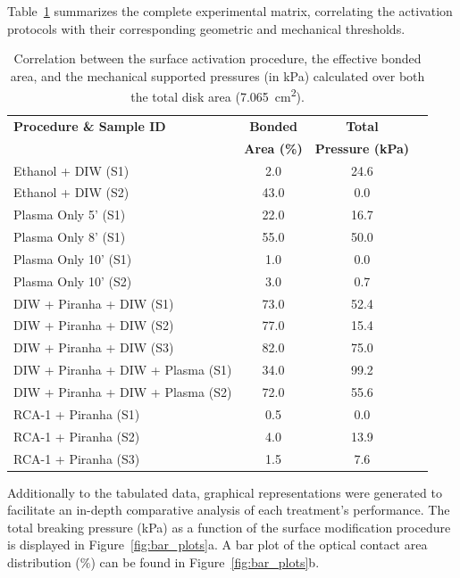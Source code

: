Table~\ref{tab:tensile_results} summarizes the complete experimental matrix,
correlating the activation protocols with their corresponding geometric and
mechanical thresholds.
\begin{table}[htbp]
    \centering
    \caption{Correlation between the surface activation procedure, the
    effective bonded area, and the mechanical supported pressures (in kPa)
    calculated over both the total disk area (\SI{7.065}{\centi\meter\squared}).}
    \label{tab:tensile_results}
    \begin{tabular}{lccc}
        \toprule
        \textbf{Procedure \& Sample ID} & \textbf{Bonded} & \textbf{Total} 
        \\
                                        & \textbf{Area (\%)} &
        \textbf{Pressure (kPa)}  \\
        \midrule
        Ethanol + DIW (S1)                & 2.0  & 24.6   \\
        Ethanol + DIW (S2)                & 43.0 & 0.0      \\
        Plasma Only 5' (S1)               & 22.0 & 16.7    \\
        Plasma Only 8' (S1)               & 55.0 & 50.0  \\
        Plasma Only 10' (S1)              & 1.0  & 0.0      \\
        Plasma Only 10' (S2)              & 3.0  & 0.7     \\
        DIW + Piranha + DIW (S1)          & 73.0 & 52.4     \\
        DIW + Piranha + DIW (S2)          & 77.0 & 15.4     \\
        DIW + Piranha + DIW (S3)          & 82.0 & 75.0    \\
        DIW + Piranha + DIW + Plasma (S1) & 34.0 & 99.2  \\
        DIW + Piranha + DIW + Plasma (S2) & 72.0 & 55.6    \\
        RCA-1 + Piranha (S1)              & 0.5  & 0.0      \\
        RCA-1 + Piranha (S2)              & 4.0  & 13.9    \\
        RCA-1 + Piranha (S3)              & 1.5  & 7.6    \\
        \bottomrule
    \end{tabular}
\end{table}

Additionally to the tabulated data, graphical representations were generated
to facilitate an in-depth comparative analysis of each treatment's
performance. The total breaking pressure (kPa) as a
function of the surface modification procedure is displayed in
Figure~\ref{fig:bar_plots}a. A bar plot of the optical
contact area distribution ($\%$) can be found in Figure~\ref{fig:bar_plots}b.

